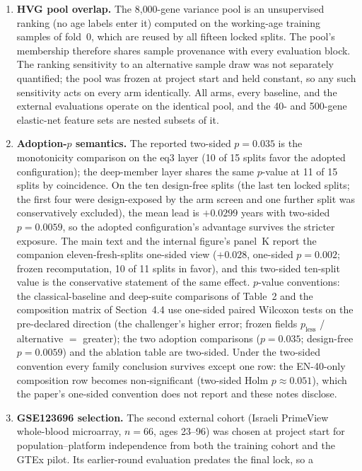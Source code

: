 \documentclass[11pt]{article}
\begin{document}
\begin{enumerate}
unsupported by the literature audit and stand as falsifiable model-generated
hypotheses.
\item \textbf{HVG pool overlap.} The 8{,}000-gene variance pool is an
unsupervised ranking (no age labels enter it) computed on the working-age
training samples of fold~0, which are reused by all fifteen locked splits. The
pool's membership therefore shares sample provenance with every evaluation
block. The ranking sensitivity to an alternative sample draw was not
separately quantified; the pool was frozen at project start and held constant,
so any such sensitivity acts on every arm identically. All arms, every
baseline, and the external evaluations operate on the identical pool, and the
40- and 500-gene elastic-net feature sets are nested subsets of it.
\item \textbf{Adoption-$p$ semantics.} The reported two-sided $p=0.035$ is the
monotonicity comparison on the eq3 layer (10 of 15 splits favor the adopted
configuration); the deep-member layer shares the same $p$-value at 11 of 15
splits by coincidence. On the ten design-free splits (the last ten locked
splits; the first four were design-exposed by the arm screen and one further
split was conservatively excluded), the mean lead is $+0.0299$ years with
two-sided $p=0.0059$, so the adopted configuration's advantage survives the
stricter exposure. The main text and the internal figure's panel~K report the
companion eleven-fresh-splits one-sided view ($+0.028$, one-sided
$p=0.002$; frozen recomputation, 10 of 11 splits in favor), and this
two-sided ten-split value is the conservative statement of the same effect.
$p$-value conventions: the classical-baseline and
deep-suite comparisons of Table~2 and the composition matrix of Section~4.4
use one-sided paired Wilcoxon tests on the pre-declared direction (the
challenger's higher error; frozen fields $p_{\text{less}}$ / alternative
$=$ greater); the two adoption comparisons ($p=0.035$; design-free
$p=0.0059$) and the ablation table are two-sided. Under the two-sided
convention every family conclusion survives except one row: the EN-40-only
composition row becomes non-significant (two-sided Holm
$p\approx 0.051$), which the paper's one-sided convention does not
report and these notes disclose.
\item \textbf{GSE123696 selection.} The second external cohort (Israeli
PrimeView whole-blood microarray, $n=66$, ages 23--96) was chosen at project
start for population--platform independence from both the training cohort and
the GTEx pilot. Its earlier-round evaluation predates the final lock, so a

\end{enumerate}
\end{document}
